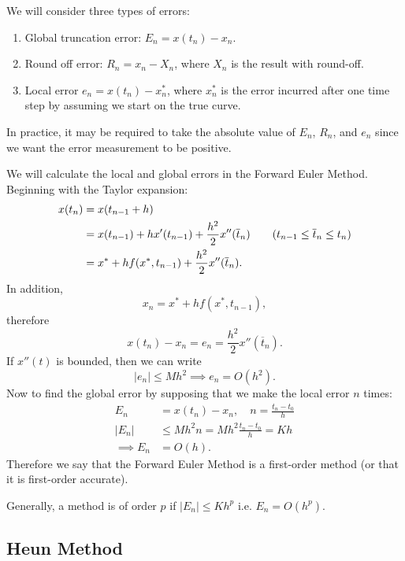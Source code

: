 We will consider three types of errors:
\begin{enumerate}
	\item Global truncation error: $E_n = x(t_n) - x_n$.
	\item Round off error: $R_n = x_n - X_n$, where $X_n$ is the result with round-off.
	\item Local error $e_n = x(t_n) - x_n^*$, where $x_n^*$ is the error incurred after one time step by assuming we start on the true curve.
\end{enumerate}

In practice, it may be required to take the absolute value of $E_n$, $R_n$, and $e_n$ since we want the error measurement to be positive.

\begin{eg}
	We will calculate the local and global errors in the Forward Euler Method. Beginning with the Taylor expansion:
	\begin{align*}
		x(t_n) &= x(t_{n-1} + h) \\ 
		&= x(t_{n-1}) + hx'(t_{n-1}) + \frac{h^2}{2}x''(\overline{t}_n) \tag{$t_{n-1} \leq \overline{t}_n \leq t_n$} \\
		&= x^* + hf(x^*, t_{n-1}) + \frac{h^2}{2}x''(\overline{t}_n).
	\end{align*}
	In addition,
	\[
	x_n = x^* + h f(x^*, t_{n-1}),
	\]
	therefore
	\[
	x(t_n) - x_n = e_n = \frac{h^2}{2}x''(\overline{t}_n).
	\]
	If $x''(t)$ is bounded, then we can write
	\[
	|e_n| \leq M h^2 \implies e_n = O(h^2).
	\]
	Now to find the global error by supposing that we make the local error $n$ times:
	\begin{align*}
		E_n &= x(t_n) - x_n, \quad n = \frac{t_n-t_0}{h} \\
		|E_n| &\leq M h^2 n = M h^2 \frac{t_n-t_0}{h} = Kh \\
		\implies E_n &= O(h).
	\end{align*}
	Therefore we say that the Forward Euler Method is a first-order method (or that it is first-order accurate).
\end{eg}

\begin{remark}
	Generally, a method is of order $p$ if $|E_n| \leq K h^p$ i.e. $E_n = O(h^p)$.
\end{remark}

\subsection{Heun Method}

